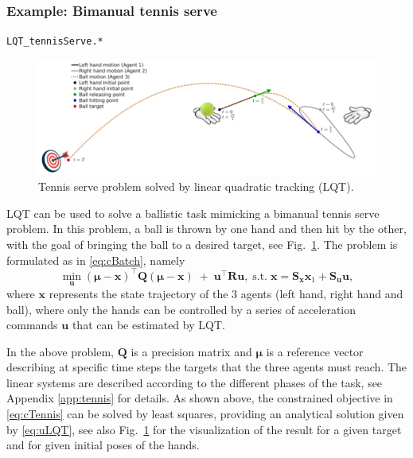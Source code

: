 \documentclass[10pt,a4paper]{article} %
\newcommand{\trsp}{{\scriptscriptstyle\top}}
\newcommand{\filename}[1]{\colorbox{rr2}{\color{white}\texttt{#1}}}
\begin{document}
\subsubsection*{Example: Bimanual tennis serve}
\begin{flushright}
\filename{LQT\_tennisServe.*}
\end{flushright}

\begin{figure}
\centering
\includegraphics[width=.7\columnwidth]{images/LQT_tennisServe01.jpg}
\caption{\footnotesize
Tennis serve problem solved by linear quadratic tracking (LQT).
}
\label{fig:LQT_tennis}
\end{figure}

LQT can be used to solve a ballistic task mimicking a bimanual tennis serve problem. In this problem, a ball is thrown by one hand and then hit by the other, with the goal of bringing the ball to a desired target, see Fig.~\ref{fig:LQT_tennis}. 
The problem is formulated as in \eqref{eq:cBatch}, namely 
\begin{equation}
	\min_{\bm{u}} {(\bm{\mu}-\bm{x})}^{\!\trsp}
	\bm{Q} 
	(\bm{\mu}-\bm{x})
	\;+\;
	\bm{u}^{\!\trsp} \!\bm{R} \bm{u},
	\;\text{s.t.}\;
	\bm{x}=\bm{S}_{\bm{x}}\bm{x}_1+\bm{S}_{\bm{u}}\bm{u},
	\label{eq:cTennis}
\end{equation}
where $\bm{x}$ represents the state trajectory of the 3 agents (left hand, right hand and ball), where only the hands can be controlled by a series of acceleration commands $\bm{u}$ that can be estimated by LQT.

In the above problem, $\bm{Q}$ is a precision matrix and $\bm{\mu}$ is a reference vector describing at specific time steps the targets that the three agents must reach. The linear systems are described according to the different phases of the task, see Appendix \ref{app:tennis} for details. As shown above, the constrained objective in \eqref{eq:cTennis} can be solved by least squares, providing an analytical solution given by \eqref{eq:uLQT}, see also Fig.~\ref{fig:LQT_tennis} for the visualization of the result for a given target and for given initial poses of the hands.


\end{document}
